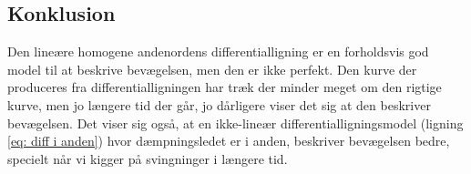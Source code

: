 \subsection{Konklusion}
Den lineære homogene andenordens differentialligning er en forholdsvis god model til at beskrive bevægelsen, men den er ikke perfekt. 
Den kurve der produceres fra differentialligningen har træk der minder meget om den rigtige kurve, men jo længere tid der går, jo dårligere viser det sig at den beskriver bevægelsen. 
Det viser sig også, at en ikke-lineær differentialligningsmodel (ligning \ref{eq: diff i anden}) hvor dæmpningsledet er i anden, beskriver bevægelsen bedre, specielt når vi kigger på svingninger i længere tid.

